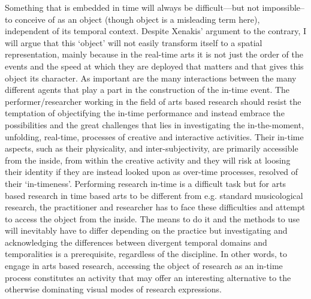 Something that is embedded in time will always be difficult---but not impossible--to conceive of as an object (though object is a misleading term here), independent of its temporal context. Despite Xenakis' argument to the contrary, I will argue that this `object' will not easily transform itself to a spatial representation, mainly because in the real-time arts it is not just the order of the events and the speed at which they are deployed that matters and that gives this object its character. As important are the many interactions between the many different agents that play a part in the construction of the in-time event. The performer/researcher working in the field of arts based research should resist the temptation of objectifying the in-time performance and instead embrace the possibilities and the great challenges that lies in investigating the in-the-moment, unfolding, real-time, processes of creative and interactive activities. Their in-time aspects, such as their physicality, and inter-subjectivity, are primarily accessible from the inside, from within the creative activity and they will risk at loosing their identity if they are instead looked upon as over-time processes, resolved of their `in-timeness'. Performing research in-time is a difficult task but for arts based research in time based arts to be different from e.g. standard musicological research, the practitioner and researcher has to face these difficulties and attempt to access the object from the inside. The means to do it and the methods to use will inevitably have to differ depending on the practice but investigating and acknowledging the differences between divergent temporal domains and temporalities is a prerequisite, regardless of the discipline. In other words, to engage in arts based research, accessing the object of research as an in-time process constitutes an activity that may offer an interesting alternative to the otherwise dominating visual modes of research expressions. %
